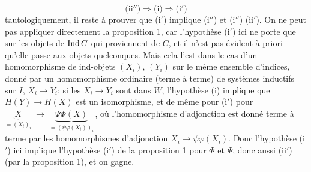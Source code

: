 \noindent{}%
\[
\text{(ii$''$)} \Longrightarrow \text{(i)} \Longrightarrow \text{(i$'$)}
\]
tautologiquement, il reste à prouver que (i$'$) implique (i$''$) et (i$''$) (ii$'$). On ne peut pas appliquer directement la proposition 1, car l'hypothèse (i$'$) ici ne porte que sur les objets de $\operatorname{Ind} C$ qui proviennent de $C$, et il n'est pas évident à priori qu'elle passe aux objets quelconques. Mais cela l'est dans le cas d'un homomorphisme de ind-objets $(X_i)$, $(Y_i)$ sur le même ensemble d'indices, donné par un homomorphisme ordinaire (terme à terme) de systèmes inductifs sur $I$, $X_i \longrightarrow Y_i$: si les $X_i \longrightarrow Y_i$ sont dans $W$, l'hypothèse (i) implique que $H(Y) \longrightarrow H(X)$ est un isomorphisme, et de même pour (i$'$) pour $\underbrace{X}_{=(X_i)_i} \;\longrightarrow\; \underbrace{\Psi\Phi(X)}_{=(\psi\varphi(X_i))_i}$\,, où l'homomorphisme d'adjonction est donné terme à terme par les homomorphismes d'adjonction $X_i \longrightarrow \psi\varphi(X_i)$. Donc l'hypothèse (i$'$) ici implique l'hypothèse (i$'$) de la proposition 1 pour $\Phi$ et $\Psi$, donc aussi (ii$'$) (par la proposition 1), et on gagne. %

